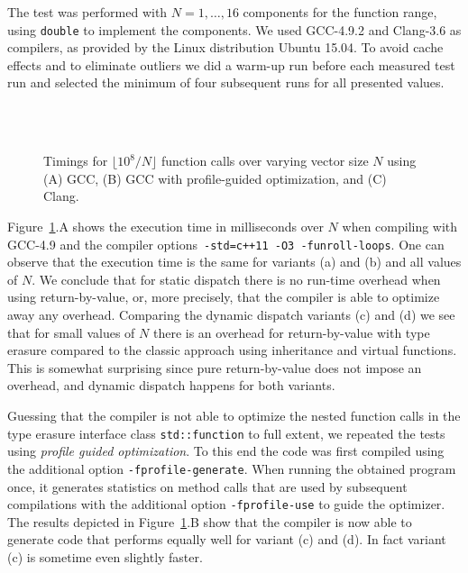 \documentclass[11pt,
                 numbers=noenddot,
                 headings=normal,
                 DIV16, BCOR10mm]{scrartcl}
\newcommand{\cpp}{\lstinline}
\theoremstyle{remark}
\begin{document}
The test was performed with $N=1,\dots,16$ components for the function range,
using \cpp{double} to implement the components.
We used GCC-4.9.2 and Clang-3.6 as compilers, as provided by the Linux
distribution Ubuntu 15.04. To avoid cache effects and to eliminate outliers we did a warm-up
run before each measured test run and selected the minimum of four subsequent
runs for all presented values.

\begin{figure}
    \centering%
    \large
    \raisebox{-0.5\height}{
      }\\
    \raisebox{-0.5\height}{
      }\\
    \raisebox{-0.5\height}{
      }%
    \caption{Timings for $\lfloor 10^8/N \rfloor$ function calls over
      varying vector size $N$ using (A) GCC, (B) GCC with profile-guided optimization, and
      (C) Clang.}%
    \label{fig:timings}
\end{figure}

Figure~\ref{fig:timings}.A
shows the execution time in milliseconds over $N$
when compiling with GCC-4.9 and the compiler options~\texttt{-std=c++11 -O3 -funroll-loops}.
One can observe that the execution time is the same for variants (a) and (b) and all values
of $N$. We conclude that for static dispatch there is no run-time overhead when using
return-by-value, or, more precisely, that the compiler is able to optimize away any overhead.
Comparing the dynamic dispatch variants (c) and (d) we see that for small values of $N$ there is an overhead
for return-by-value with type erasure compared to the classic approach using inheritance and virtual functions.
This is somewhat surprising since pure return-by-value does not impose
an overhead, and dynamic dispatch happens for both variants.

Guessing that the compiler is not able to optimize the nested function
calls in the type erasure interface class \cpp{std::function} to full extent,
we repeated the tests using \emph{profile guided optimization}.
To this end the code was first compiled using the additional option
\texttt{-fprofile-generate}. When running the obtained program once,
it generates statistics on method calls that are used by
subsequent compilations with the additional option
\texttt{-fprofile-use} to guide the optimizer.
The results depicted in Figure~\ref{fig:timings}.B show that
the compiler is now able to generate code that performs equally
well for variant (c) and (d). In fact variant (c) is sometime even
slightly faster.
\end{document}
